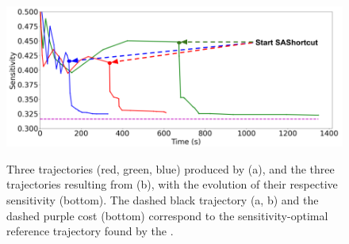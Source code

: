 

\begin{figure}[h!]
    \centering
    \\
    \includegraphics[width=0.7\linewidth]{figures/samp/U_shape_3in1_sensi.png}
    \caption{Three trajectories (red, green, blue) produced by  (a), and the three trajectories resulting from  (b), with the evolution of their respective sensitivity (bottom). 
    The dashed black trajectory (a, b) and the dashed purple cost (bottom) correspond to the sensitivity-optimal reference trajectory found by the .}
    \label{fig:U_shape}
\end{figure}

